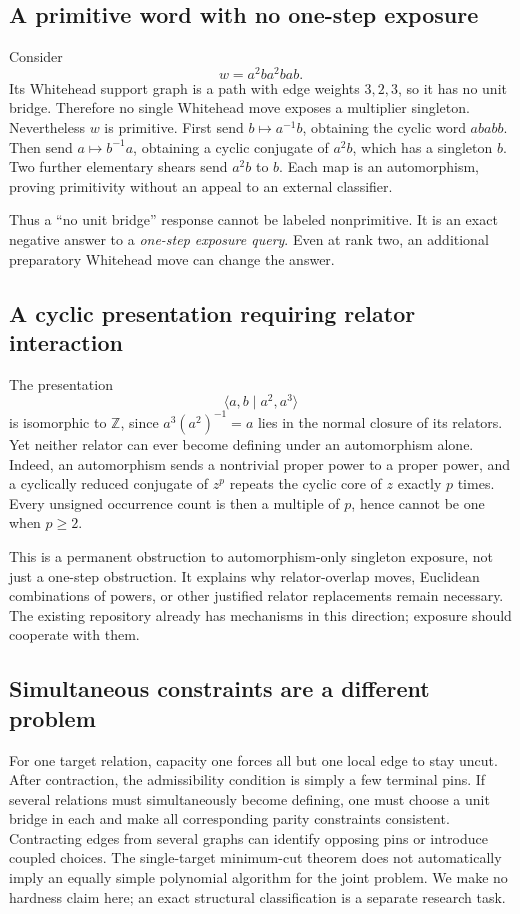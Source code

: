 \documentclass[11pt,letterpaper]{article}
\theoremstyle{definition}\newtheorem{definition}[theorem]{Definition}
\newcommand{\Z}{\mathbb Z}
\begin{document}
\subsection{A primitive word with no one-step exposure}
Consider
\[
 w=a^2ba^2bab.
\]
Its Whitehead support graph is a path with edge weights $3,2,3$, so it has no unit bridge. Therefore no single Whitehead move exposes a multiplier singleton. Nevertheless $w$ is primitive. First send $b\mapsto a^{-1}b$, obtaining the cyclic word $ababb$. Then send $a\mapsto b^{-1}a$, obtaining a cyclic conjugate of $a^2b$, which has a singleton $b$. Two further elementary shears send $a^2b$ to $b$. Each map is an automorphism, proving primitivity without an appeal to an external classifier.

Thus a ``no unit bridge'' response cannot be labeled nonprimitive. It is an exact negative answer to a \emph{one-step exposure query}. Even at rank two, an additional preparatory Whitehead move can change the answer.

\subsection{A cyclic presentation requiring relator interaction}
The presentation
\begin{equation}\label{eq:properpowers}
 \langle a,b\mid a^2,a^3\rangle
\end{equation}
is isomorphic to $\Z$, since $a^3(a^2)^{-1}=a$ lies in the normal closure of its relators. Yet neither relator can ever become defining under an automorphism alone. Indeed, an automorphism sends a nontrivial proper power to a proper power, and a cyclically reduced conjugate of $z^p$ repeats the cyclic core of $z$ exactly $p$ times. Every unsigned occurrence count is then a multiple of $p$, hence cannot be one when $p\ge2$.

This is a permanent obstruction to automorphism-only singleton exposure, not just a one-step obstruction. It explains why relator-overlap moves, Euclidean combinations of powers, or other justified relator replacements remain necessary. The existing repository already has mechanisms in this direction; exposure should cooperate with them.

\subsection{Simultaneous constraints are a different problem}
For one target relation, capacity one forces all but one local edge to stay uncut. After contraction, the admissibility condition is simply a few terminal pins. If several relations must simultaneously become defining, one must choose a unit bridge in each and make all corresponding parity constraints consistent. Contracting edges from several graphs can identify opposing pins or introduce coupled choices. The single-target minimum-cut theorem does not automatically imply an equally simple polynomial algorithm for the joint problem. We make no hardness claim here; an exact structural classification is a separate research task.
\end{document}
